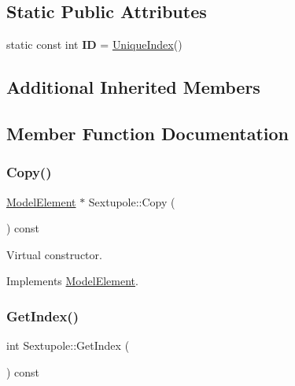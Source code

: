 \subsection*{Static Public Attributes}
\begin{DoxyCompactItemize}
\item 
\mbox{\label{classSextupole_af51e946664618cc54a8d0dc01599298d}} 
static const int {\bfseries ID} = \hyperlink{classAcceleratorComponent_aa7ad4d39e1a488b705983842ed1ac784}{Unique\+Index}()
\end{DoxyCompactItemize}
\subsection*{Additional Inherited Members}


\subsection{Member Function Documentation}
\mbox{\label{classSextupole_ad2dad4cec1619235b9341c9d8fb855a8}} 
\subsubsection{\texorpdfstring{Copy()}{Copy()}}
{\footnotesize\ttfamily \hyperlink{classModelElement}{Model\+Element} $\ast$ Sextupole\+::\+Copy (\begin{DoxyParamCaption}{ }\end{DoxyParamCaption}) const\hspace{0.3cm}{\ttfamily [virtual]}}

Virtual constructor. 

Implements \hyperlink{classModelElement_ac3ca26d649bd86a0f31a58ae09941429}{Model\+Element}.

\mbox{\label{classSextupole_ab86d63dda91c41c870c89069724681a2}} 
\subsubsection{\texorpdfstring{Get\+Index()}{GetIndex()}}
{\footnotesize\ttfamily int Sextupole\+::\+Get\+Index (\begin{DoxyParamCaption}{ }\end{DoxyParamCaption}) const\hspace{0.3cm}{\ttfamily [virtual]}}

